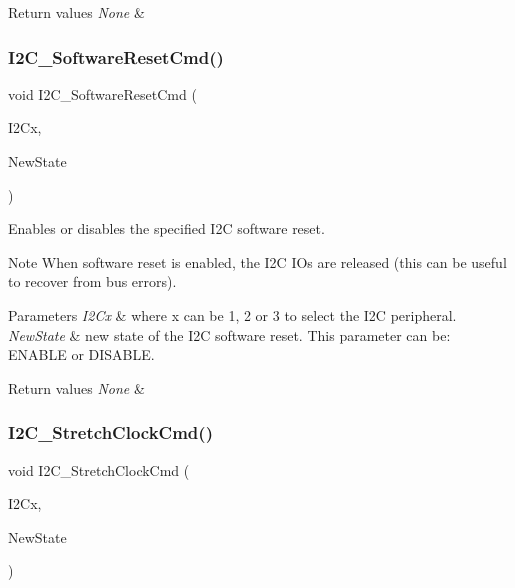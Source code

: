 \begin{DoxyRetVals}{Return values}
{\em None} & \\
\hline
\end{DoxyRetVals}
\mbox{\label{group___i2_c_ga1289c908aeb882443aba323b459c638b}} 
\subsubsection{\texorpdfstring{I2\+C\+\_\+\+Software\+Reset\+Cmd()}{I2C\_SoftwareResetCmd()}}
{\footnotesize\ttfamily void I2\+C\+\_\+\+Software\+Reset\+Cmd (\begin{DoxyParamCaption}\item[{I2\+C\+\_\+\+Type\+Def $\ast$}]{I2\+Cx,  }\item[{Functional\+State}]{New\+State }\end{DoxyParamCaption})}



Enables or disables the specified I2C software reset. 

\begin{DoxyNote}{Note}
When software reset is enabled, the I2C I\+Os are released (this can be useful to recover from bus errors). ~\newline

\end{DoxyNote}

\begin{DoxyParams}{Parameters}
{\em I2\+Cx} & where x can be 1, 2 or 3 to select the I2C peripheral. \\
\hline
{\em New\+State} & new state of the I2C software reset. This parameter can be\+: E\+N\+A\+B\+LE or D\+I\+S\+A\+B\+LE. \\
\hline
\end{DoxyParams}

\begin{DoxyRetVals}{Return values}
{\em None} & \\
\hline
\end{DoxyRetVals}
\mbox{\label{group___i2_c_ga7459feb3b1dfcd3e4f6574002ca7d3bd}} 
\subsubsection{\texorpdfstring{I2\+C\+\_\+\+Stretch\+Clock\+Cmd()}{I2C\_StretchClockCmd()}}
{\footnotesize\ttfamily void I2\+C\+\_\+\+Stretch\+Clock\+Cmd (\begin{DoxyParamCaption}\item[{I2\+C\+\_\+\+Type\+Def $\ast$}]{I2\+Cx,  }\item[{Functional\+State}]{New\+State }\end{DoxyParamCaption})}



